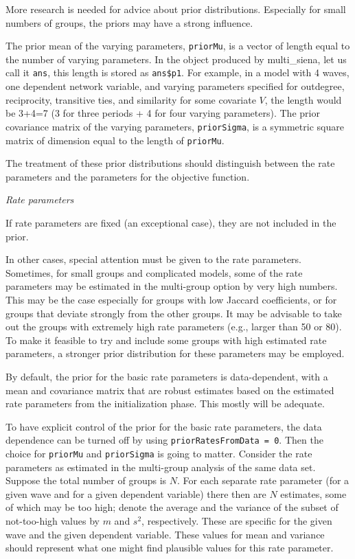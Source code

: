 \documentclass[a4paper,fleqn,11pt]{article}
\newcommand{\+}{\, + \,}
\begin{document}
More research is needed for advice about prior distributions.
Especially for small numbers of groups, the priors may have a strong influence.
\medskip

The prior mean of the varying parameters,
\texttt{priorMu}, is a vector of length equal to the number of varying parameters.
In the object produced by \textsf{multi\_siena}, let us call it \texttt{ans},
this length is stored as \texttt{ans\$p1}.
For example, in a model with 4 waves, one dependent network variable,
and varying parameters specified for outdegree, reciprocity,
transitive ties, and similarity for some covariate $V$,
the length would be 3+4=7 (3 for three periods +
4 for four varying parameters).
The prior covariance matrix of the varying parameters,
\texttt{priorSigma}, is a symmetric square matrix of dimension
equal to the length of \texttt{priorMu}.

The treatment of these prior distributions
should distinguish between the rate parameters and the parameters for the
objective function.
\medskip

\noindent
\emph{Rate parameters}
\smallskip

\noindent
If rate parameters are fixed (an exceptional case), they are
not included in the prior.

In other cases, special attention must be given to the rate parameters.
Sometimes, for small groups and complicated models, some of the
rate parameters may be estimated in the multi-group option by very high
numbers. This may be the case especially for groups with low Jaccard
coefficients, or for groups that deviate strongly from the other groups.
It may be advisable to take out the groups with extremely high
rate parameters (e.g., larger than 50 or 80).
To make it feasible to try and include some groups with high estimated rate
parameters, a stronger prior distribution for these parameters may be employed.

By default, the prior for the basic rate parameters is data-dependent,
with a mean and covariance matrix that are robust estimates
based on the estimated rate parameters from the initialization phase.
This mostly will be adequate.

To have explicit control of the prior for the basic rate parameters,
the data dependence can be turned off by using
\texttt{priorRatesFromData = 0}.
Then the choice for \texttt{priorMu} and \texttt{priorSigma}
is going to matter.
Consider the rate parameters as estimated in the multi-group analysis
of the same data set.
Suppose the total number of groups is $N$.
For each separate rate parameter (for a given wave
and for a given dependent variable) there then are $N$ estimates,
some of which may be too high; denote the average and the variance
of the subset of not-too-high values by $m$ and $s^2$, respectively.
These are specific for the  given wave and the given dependent variable.
These values for mean and variance should
represent what one might find plausible values for this rate parameter.
\end{document}
